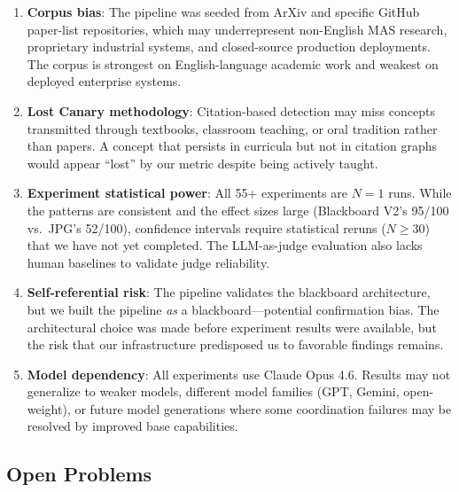 \documentclass{article}
\begin{document}
\begin{enumerate}[nosep]
  \item \textbf{Corpus bias}: The pipeline was seeded from ArXiv and specific GitHub
    paper-list repositories, which may underrepresent non-English MAS research,
    proprietary industrial systems, and closed-source production deployments. The corpus
    is strongest on English-language academic work and weakest on deployed enterprise
    systems.
  \item \textbf{Lost Canary methodology}: Citation-based detection may miss concepts
    transmitted through textbooks, classroom teaching, or oral tradition rather than
    papers. A concept that persists in curricula but not in citation graphs would appear
    ``lost'' by our metric despite being actively taught.
  \item \textbf{Experiment statistical power}: All 55+ experiments are $N{=}1$ runs.
    While the patterns are consistent and the effect sizes large (Blackboard V2's
    95/100 vs.\ JPG's 52/100), confidence intervals require statistical reruns
    ($N{\geq}30$) that we have not yet completed. The LLM-as-judge evaluation also
    lacks human baselines to validate judge reliability.
  \item \textbf{Self-referential risk}: The pipeline validates the blackboard
    architecture, but we built the pipeline \emph{as} a blackboard---potential
    confirmation bias. The architectural choice was made before experiment results were
    available, but the risk that our infrastructure predisposed us to favorable
    findings remains.
  \item \textbf{Model dependency}: All experiments use Claude Opus 4.6. Results may not
    generalize to weaker models, different model families (GPT, Gemini, open-weight),
    or future model generations where some coordination failures may be resolved by
    improved base capabilities.
\end{enumerate}

\subsection{Open Problems}
\label{sec:disc-open}
\end{document}
